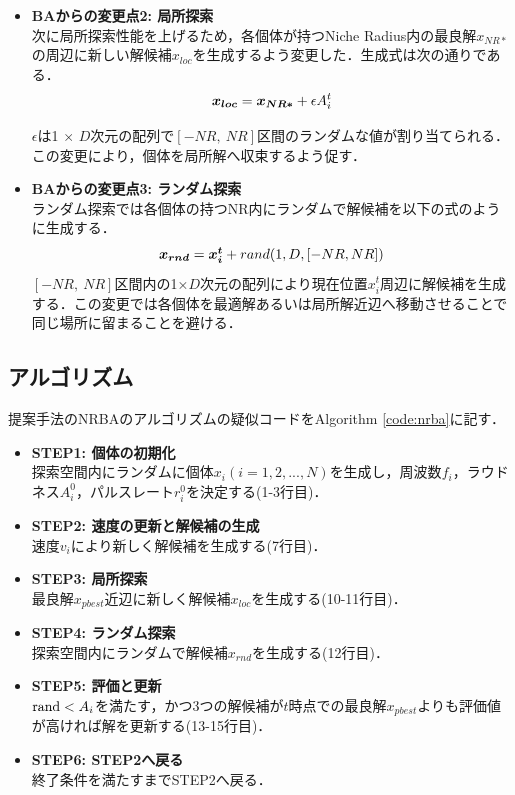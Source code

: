 \documentclass[a4j,11pt]{jarticle}
\begin{document}
\begin{itemize}
\item {\bf BAからの変更点2: 局所探索} \\
次に局所探索性能を上げるため，各個体が持つNiche Radius内の最良解${x_{NR*}}$の周辺に新しい解候補${x_{loc}}$を生成するよう変更した．生成式は次の通りである．
\begin{equation}
\label{eq:nrloc}
\mbox{\boldmath $x_{loc}$}=\mbox{\boldmath $x_{NR*}$} + \epsilon A_i^t
\end{equation}

$\epsilon$は1 $\times$ $D$次元の配列で$[-NR, \ NR]$区間のランダムな値が割り当てられる．この変更により，個体を局所解へ収束するよう促す．
\item {\bf BAからの変更点3: ランダム探索} \\
ランダム探索では各個体の持つNR内にランダムで解候補を以下の式のように生成する．
\begin{equation}
\label{eq:nrrnd}
\mbox{\boldmath $x_{rnd}$}=\mbox{\boldmath $x_i^t$} + rand(1,D,[-NR, NR])
\end{equation}
$[-NR, \ NR]$区間内の1×$D$次元の配列により現在位置$x_i^t$周辺に解候補を生成する．この変更では各個体を最適解あるいは局所解近辺へ移動させることで同じ場所に留まることを避ける．
\end{itemize}

\subsection{アルゴリズム}
\label{ss:NRBA-algorithm}
提案手法のNRBAのアルゴリズムの疑似コードをAlgorithm \ref{code:nrba}に記す．

\begin{itemize}
\item {\bf STEP1: 個体の初期化}\\
探索空間内にランダムに個体$x_i (i=1,2,...,N)$を生成し，周波数$f_i$，ラウドネス$A_i^0$，パルスレート$r_i^0$を決定する(1-3行目)．
\item {\bf STEP2: 速度の更新と解候補の生成}\\
速度$v_i$により新しく解候補を生成する(7行目)．
\item {\bf STEP3: 局所探索}\\
最良解$x_{pbest}$近辺に新しく解候補$x_{loc}$を生成する(10-11行目)．
\item {\bf STEP4: ランダム探索}\\
探索空間内にランダムで解候補$x_{rnd}$を生成する(12行目)．
\item {\bf STEP5: 評価と更新}\\
${\rm rand} < A_i$を満たす，かつ3つの解候補が$t$時点での最良解$x_{pbest}$よりも評価値が高ければ解を更新する(13-15行目)．
\item {\bf STEP6: STEP2へ戻る}\\
終了条件を満たすまでSTEP2へ戻る．
\end{itemize}
\end{document}
